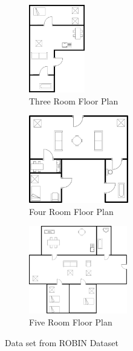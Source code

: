                 \begin{figure}[h]
                        \centering
                        \begin{subfigure}{.33\textwidth}
                                \centering
                                \includegraphics[height=1.5in]{img/chapter_6/3room.jpg}
                                \caption{Three Room Floor Plan}
                                \label{fig:Three Room Floor Plan}
                        \end{subfigure}
                        \begin{subfigure}{.33\textwidth}
                                \centering
                                \includegraphics[height=1.5in]{img/chapter_6/4room.jpg}
                                \caption{Four Room Floor Plan}
                                \label{fig:Four Room Floor Plan}
                        \end{subfigure}
                        \begin{subfigure}{.3\textwidth}
                                \centering
                                \includegraphics[height=1.5in]{img/chapter_6/5room.jpg}
                                \caption{Five Room Floor Plan}
                                \label{fig:Five Room Floor Plan}
                        \end{subfigure}
                        \caption{Data set from ROBIN Dataset}
                        \label{fig:Data set from ROBIN Dataset}
                \end{figure}
